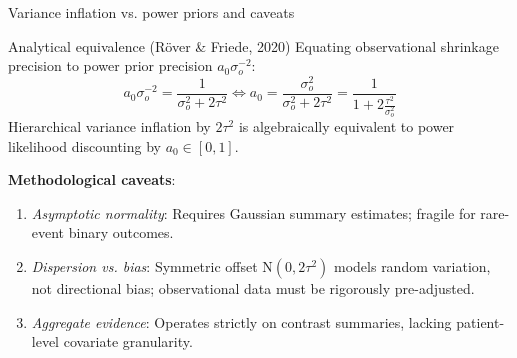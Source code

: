 \documentclass[t]{beamer}
\begin{document}
\begin{frame}{Variance inflation vs. power priors and caveats}
    \begin{block}{Analytical equivalence (R\"over \& Friede, 2020)}
    Equating observational shrinkage precision to power prior precision $a_0 \sigma_o^{-2}$:
    \begin{equation*}
        a_0 \sigma_o^{-2} = \frac{1}{\sigma_o^2 + 2\tau^2} \iff a_0 = \frac{\sigma_o^2}{\sigma_o^2 + 2\tau^2} = \frac{1}{1 + 2\frac{\tau^2}{\sigma_o^2}}
    \end{equation*}
    Hierarchical variance inflation by $2\tau^2$ is algebraically equivalent to power likelihood discounting by $a_0 \in [0, 1]$.
    \end{block}

    \textbf{Methodological caveats}:
    \begin{enumerate}
        \item \emph{Asymptotic normality}: Requires Gaussian summary estimates; fragile for rare-event binary outcomes.
        \item \emph{Dispersion vs. bias}: Symmetric offset $\text{N}(0, 2\tau^2)$ models random variation, not directional bias; observational data must be rigorously pre-adjusted.
        \item \emph{Aggregate evidence}: Operates strictly on contrast summaries, lacking patient-level covariate granularity.
    \end{enumerate}
\end{frame}
\end{document}
